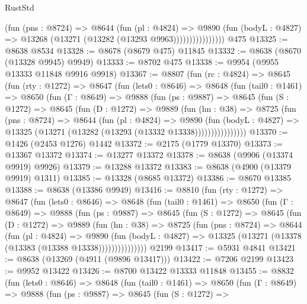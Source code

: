 \begin{lexlean}{RustStd}
\begin{coremodule}
                        (fun (pns : @8724) =>
                        @8644
                          (fun (pl : @4824) =>
                          @9890
                            (fun (bodyL : @4827) =>
                            @13268 (@13271 (@13282 (@13293 @9963))))))))))))))))
    @475
@13325 := @8638 @8534
@13328 := @8678 (@8679 @475) @11845
@13332 := @8638 (@8670 (@13328 @9945) @9949)
@13333 := @8702 @475
@13338 := @9954 (@9955 @13333 @11848 @9916 @9918)
@13367 := @8807
    (fun (rc : @4824) =>
    @8645
      (fun (rty : @1272) =>
      @8647
        (fun (lets0 : @8646) =>
        @8648
          (fun (tail0 : @1461) =>
          @8650
            (fun (Γ : @8649) =>
            @9888
              (fun (ps : @9887) =>
              @8645
                (fun (S : @1272) =>
                @8645
                  (fun (D : @1272) =>
                  @9889
                    (fun (hn : @38) =>
                    @8725
                      (fun (pns : @8724) =>
                      @8644
                        (fun (pl : @4824) =>
                        @9890
                          (fun (bodyL : @4827) =>
                          @13325 (@13271 (@13282 (@13293 (@13332 @13338))))))))))))))))
@13370 := @1426 (@2453 @1276) @1442
@13372 := @2175 (@1779 @13370)
@13373 := @13367 @13372
@13374 := @13277 @13372
@13378 := @8638 (@9906 (@13374 @9919) @9926)
@13379 := @13288 @13372
@13383 := @8638 (@4900 (@13379 @9919) @1311)
@13385 := @13328 (@8685 @13372)
@13386 := @8670 @13385
@13388 := @8638 (@13386 @9949)
@13416 := @8810
    (fun (rty : @1272) =>
    @8647
      (fun (lets0 : @8646) =>
      @8648
        (fun (tail0 : @1461) =>
        @8650
          (fun (Γ : @8649) =>
          @9888
            (fun (ps : @9887) =>
            @8645
              (fun (S : @1272) =>
              @8645
                (fun (D : @1272) =>
                @9889
                  (fun (hn : @38) =>
                  @8725
                    (fun (pns : @8724) =>
                    @8644
                      (fun (pl : @4824) =>
                      @9890
                        (fun (bodyL : @4827) =>
                        @13325 (@13271 (@13378 (@13383 (@13388 @13338)))))))))))))))
    @2199
@13417 := @5931 @4841
@13421 := @8638 (@13269 (@4911 (@9896 @13417)))
@13422 := @7206 @2199
@13423 := @9952 @13422
@13426 := @8700 @13422 @13333 @11848
@13455 := @8832
    (fun (lets0 : @8646) =>
    @8648
      (fun (tail0 : @1461) =>
      @8650
        (fun (Γ : @8649) =>
        @9888
          (fun (ps : @9887) =>
          @8645
            (fun (S : @1272) =>

\end{coremodule}
\end{lexlean}
